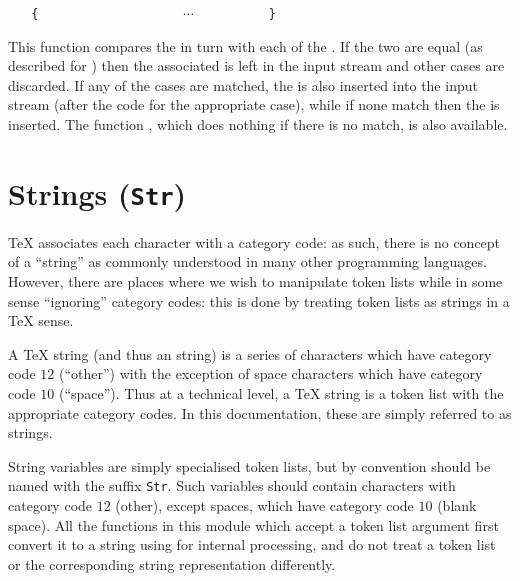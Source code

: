 \documentclass[oneside]{book}
\begin{document}
\begin{function}{\tlVarCaseTF}
\begin{syntax}
 
~ ~ \verb"{"
~ ~ ~ ~  
~ ~ ~ ~  
~ ~ ~ ~ $\cdots$
~ ~ ~ ~  
~ ~ \verb"}"
~ ~ 
~ ~ 
\end{syntax}
This function compares the  in turn
with each of the . If the two
are equal (as described for )
then the associated  is left in the input
stream and other cases are discarded. If any of the
cases are matched, the  is also inserted into the
input stream (after the code for the appropriate case), while if none
match then the  is inserted. The function ,
which does nothing if there is no match, is also available.
\begin{demohigh}
\IgnoreSpacesOn
\tlSet {}
\tlSet {}
\tlSet {}
\tlSet {}
\tlVarCaseTF {}
\IgnoreSpacesOff
\end{demohigh}
\end{function}

\chapter{Strings (\texttt{Str})}

\TeX{} associates each character with a category code: as such, there is no
concept of a \enquote{string} as commonly understood in many other
programming languages. However, there are places where we wish to manipulate
token lists while in some sense \enquote{ignoring} category codes: this is
done by treating token lists as strings in a \TeX{} sense.

A \TeX{} string (and thus an  string) is a series of characters
which have category code $12$ (\enquote{other}) with the exception of
space characters which have category code $10$ (\enquote{space}). Thus
at a technical level, a \TeX{} string is a token list with the appropriate
category codes. In this documentation, these are simply referred to as
strings.

String variables are simply specialised token lists, but by convention
should be named with the suffix \texttt{Str}.  Such variables
should contain characters with category code $12$ (other), except
spaces, which have category code $10$ (blank space).  All the
functions in this module which accept a token list argument first
convert it to a string using  for internal processing,
and do not treat a token list or the corresponding string
representation differently.
\end{document}
